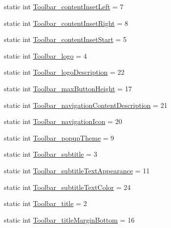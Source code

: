 \begin{DoxyCompactItemize}
\item 
static int \hyperlink{classandroid_1_1support_1_1design_1_1R_1_1styleable_a16a950fb278dbd84e59f4e5475d33578}{Toolbar\+\_\+content\+Inset\+Left} = 7
\item 
static int \hyperlink{classandroid_1_1support_1_1design_1_1R_1_1styleable_afa26b6ecdf630ac0c5f79af2ca0a1f2a}{Toolbar\+\_\+content\+Inset\+Right} = 8
\item 
static int \hyperlink{classandroid_1_1support_1_1design_1_1R_1_1styleable_a6205b5236737b47332a0c7ab6459eb3d}{Toolbar\+\_\+content\+Inset\+Start} = 5
\item 
static int \hyperlink{classandroid_1_1support_1_1design_1_1R_1_1styleable_ad96363fdb81c5fc57ecb7ca211213675}{Toolbar\+\_\+logo} = 4
\item 
static int \hyperlink{classandroid_1_1support_1_1design_1_1R_1_1styleable_adad105d3b3d5e31681bf954d0a474308}{Toolbar\+\_\+logo\+Description} = 22
\item 
static int \hyperlink{classandroid_1_1support_1_1design_1_1R_1_1styleable_a23d4ceb83bb1200d96e248f73e941f3e}{Toolbar\+\_\+max\+Button\+Height} = 17
\item 
static int \hyperlink{classandroid_1_1support_1_1design_1_1R_1_1styleable_af072d08cd3f8b67300f7852fec72150c}{Toolbar\+\_\+navigation\+Content\+Description} = 21
\item 
static int \hyperlink{classandroid_1_1support_1_1design_1_1R_1_1styleable_afd9054878cb1ec4c07888ebaf463242c}{Toolbar\+\_\+navigation\+Icon} = 20
\item 
static int \hyperlink{classandroid_1_1support_1_1design_1_1R_1_1styleable_aa248f853ab7158fb2c598abe10eab5c8}{Toolbar\+\_\+popup\+Theme} = 9
\item 
static int \hyperlink{classandroid_1_1support_1_1design_1_1R_1_1styleable_a976eebe1f58a714dc8273f897a889fcc}{Toolbar\+\_\+subtitle} = 3
\item 
static int \hyperlink{classandroid_1_1support_1_1design_1_1R_1_1styleable_abb253180e44bdd9eff96211ecbe332cf}{Toolbar\+\_\+subtitle\+Text\+Appearance} = 11
\item 
static int \hyperlink{classandroid_1_1support_1_1design_1_1R_1_1styleable_a0924fc01dfcdf4dd5e6b63188a1248f3}{Toolbar\+\_\+subtitle\+Text\+Color} = 24
\item 
static int \hyperlink{classandroid_1_1support_1_1design_1_1R_1_1styleable_abec4f071992436f684430ab2be771dcb}{Toolbar\+\_\+title} = 2
\item 
static int \hyperlink{classandroid_1_1support_1_1design_1_1R_1_1styleable_a0a632f483c823b4ce646fd30c094cb6e}{Toolbar\+\_\+title\+Margin\+Bottom} = 16

\end{DoxyCompactItemize}
